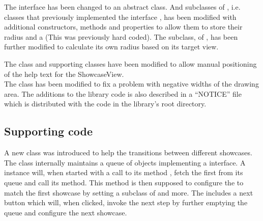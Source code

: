 The interface  has been changed to an abstract class. And subclasses of , i.e. classes that previously implemented the interface , has been modified with additional constructors, methods and properties to allow them to store their radius and a  (This was previously hard coded). The  subclass, of , has been further modified to calculate its own radius based on its target view.  

The  class and supporting classes have been modified to allow manual positioning of the help text for the ShowcaseView.\\ 
The  class has been modified to fix a problem with negative widths of the drawing area.
The additions to the library code is also described in a ``NOTICE'' file which is distributed with the code in the library's root directory. 

\subsection{Supporting code}

A new class  was introduced to help the transitions between different showcases. The class internally maintains a queue of objects implementing a  interface. A  instance will, when started with a call to its method , fetch the first  from its queue and call its  method. This  method is then supposed to configure the  to match the first showcase by setting a subclass of  and more. The  includes a next button which will, when clicked, invoke the next step by further emptying the queue and configure the next showcase.




